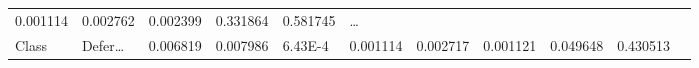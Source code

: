 \documentclass[
]{article}
\begin{document}
\begin{longtable}[]{@{}lllllllllll@{}}
\begin{minipage}[t]{0.06\columnwidth}
0.001114\strut
\end{minipage} & \begin{minipage}[t]{0.09\columnwidth}\raggedright
0.002762\strut
\end{minipage} & \begin{minipage}[t]{0.06\columnwidth}\raggedright
0.002399\strut
\end{minipage} & \begin{minipage}[t]{0.06\columnwidth}\raggedright
0.331864\strut
\end{minipage} & \begin{minipage}[t]{0.06\columnwidth}\raggedright
0.581745\strut
\end{minipage} & \begin{minipage}[t]{0.03\columnwidth}\raggedright
\ldots{}\strut
\end{minipage}\tabularnewline
\begin{minipage}[t]{0.06\columnwidth}\raggedright
Class\strut
\end{minipage} & \begin{minipage}[t]{0.06\columnwidth}\raggedright
Defer\ldots{}\strut
\end{minipage} & \begin{minipage}[t]{0.09\columnwidth}\raggedright
0.006819\strut
\end{minipage} & \begin{minipage}[t]{0.06\columnwidth}\raggedright
0.007986\strut
\end{minipage} & \begin{minipage}[t]{0.09\columnwidth}\raggedright
6.43E-4\strut
\end{minipage} & \begin{minipage}[t]{0.06\columnwidth}\raggedright
0.001114\strut
\end{minipage} & \begin{minipage}[t]{0.09\columnwidth}\raggedright
0.002717\strut
\end{minipage} & \begin{minipage}[t]{0.06\columnwidth}\raggedright
0.001121\strut
\end{minipage} & \begin{minipage}[t]{0.06\columnwidth}\raggedright
0.049648\strut
\end{minipage} & \begin{minipage}[t]{0.06\columnwidth}\raggedright
0.430513\strut
\end{minipage} & \begin{minipage}[t]{0.03\columnwidth}\raggedright

\end{minipage}
\end{longtable}
\end{document}
